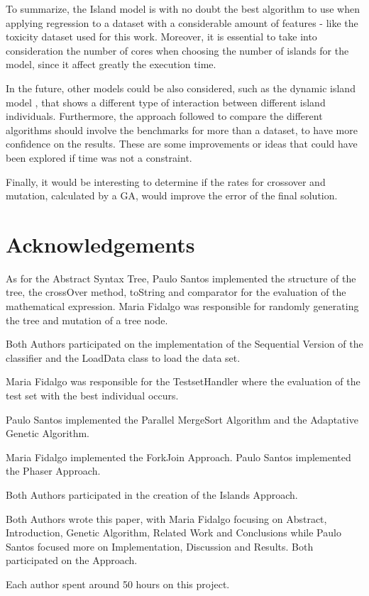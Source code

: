 \documentclass[runningheads]{llncs}
\begin{document}
To summarize, the Island model is with no doubt  the best algorithm to use when applying regression to a dataset with a considerable amount of features - like the toxicity dataset used for this work. Moreover, it is essential to take into consideration the number of cores when choosing the number of islands for the model, since it affect greatly the execution time.

In the future, other models could be also considered, such as the dynamic island model \cite{meng2017dynamic}, that shows a different type of interaction between different island individuals. Furthermore, the approach followed to compare the different algorithms should involve the benchmarks for more than a dataset, to have more confidence on the results. These are some improvements or ideas that could have been explored if time was not a constraint.

Finally, it would be interesting to determine if the rates for crossover and mutation, calculated by a GA, would  improve the error of the final solution.

\section*{Acknowledgements}

As for the Abstract Syntax Tree, Paulo Santos implemented the structure of the tree, the crossOver method, toString and comparator for the evaluation of the mathematical expression. Maria Fidalgo was responsible for randomly generating the tree and mutation of a tree node.

Both Authors participated on the implementation of the Sequential Version of the classifier and the LoadData class to load the data set.

Maria Fidalgo was responsible for the TestsetHandler where the evaluation of the test set with the best individual occurs.

Paulo Santos implemented the Parallel MergeSort Algorithm and the Adaptative Genetic Algorithm.

Maria Fidalgo implemented the ForkJoin Approach. Paulo Santos implemented the Phaser Approach.

Both Authors participated in the creation of the Islands Approach.

Both Authors wrote this paper, with Maria Fidalgo focusing on Abstract, Introduction, Genetic Algorithm, Related Work and Conclusions while Paulo Santos focused more on Implementation, Discussion and Results. Both participated on the Approach.

Each author spent around 50 hours on this project.



\end{document}
